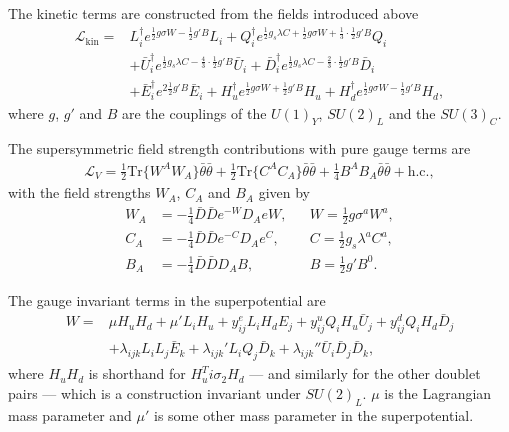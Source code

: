\documentclass[twoside,english]{uiofysmaster}
\begin{document}
The kinetic terms are constructed from the fields introduced above
\begin{align}
\mathcal{L}_{\text{kin}} =& L_i^{\dagger} e^{\frac{1}{2}g \sigma W - \frac{1}{2}g'B} L_i + Q_i^{\dagger} e^{\frac{1}{2}g_s \lambda C+ \frac{1}{2} g \sigma W + \frac{1}{3} \cdot \frac{1}{2} g' B} Q_i \nonumber \\
&+ \bar{U}_i^{\dagger} e^{\frac{1}{2}g_s \lambda C - \frac{4}{3} \cdot \frac{1}{2} g' B} \bar{U}_i + \bar{D}_i^{\dagger} e^{\frac{1}{2}g_s \lambda C - \frac{2}{3} \cdot \frac{1}{2} g' B} \bar{D}_i \nonumber \\
&+ \bar{E}_i^{\dagger} e^{2 \frac{1}{2}g'B} \bar{E}_i + H_u^{\dagger} e^{\frac{1}{2} g \sigma W + \frac{1}{2} g'B} H_u + H_d^{\dagger} e^{\frac{1}{2} g \sigma W - \frac{1}{2} g'B} H_d,
\end{align}
where $g$, $g'$ and $B$ are the couplings of the $U(1)_Y$, $SU(2)_L$ and the $SU(3)_C$. 

The supersymmetric field strength contributions with pure gauge terms are
\begin{align}
\mathcal{L}_V = \frac{1}{2} \text{Tr} \big \{ W^AW_A \big \} \bar{\theta} \bar{\theta} + \frac{1}{2} \text{Tr} \big \{ C^AC_A \big \} \bar{\theta} \bar{\theta} + \frac{1}{4} B^AB_A \bar{\theta} \bar{\theta} + \text{h.c.},
\end{align}
with the field strengths $W_A$, $C_A$ and $B_A$ given by
\begin{align}
W_A &= - \frac{1}{4} \bar{D} \bar{D} e^{-W}D_A eW, &&W = \frac{1}{2} g \sigma^a W^a,\\
C_A &= - \frac{1}{4} \bar{D} \bar{D} e^{-C} D_A e^C, &&C = \frac{1}{2} g_s\lambda^a C^a,\\
B_A &= - \frac{1}{4} \bar{D} \bar{D} D_A B, &&B = \frac{1}{2}g'B^0.
\end{align}

The gauge invariant terms in the superpotential are
\begin{align}
W =& \mu H_u H_d + \mu' L_i H_u + y_{ij}^e L_i H_d E_j + y_{ij}^u Q_i H_u \bar{U}_j + y_{ij}^d Q_i H_d \bar{D}_j \nonumber \\
&+ \lambda_{ijk} L_i L_j\bar{E}_k + \lambda_{ijk}' L_i Q_j \bar{D}_k + \lambda_{ijk}'' \bar{U}_i \bar{D}_j \bar{D}_k,
\end{align}
where $H_uH_d$ is shorthand for $H_u^T i \sigma_2 H_d$ --- and similarly for the other doublet pairs --- which is a construction invariant under $SU(2)_L$. $\mu$ is the Lagrangian mass parameter and $\mu'$ is some other mass parameter in the superpotential.
 
\end{document}
